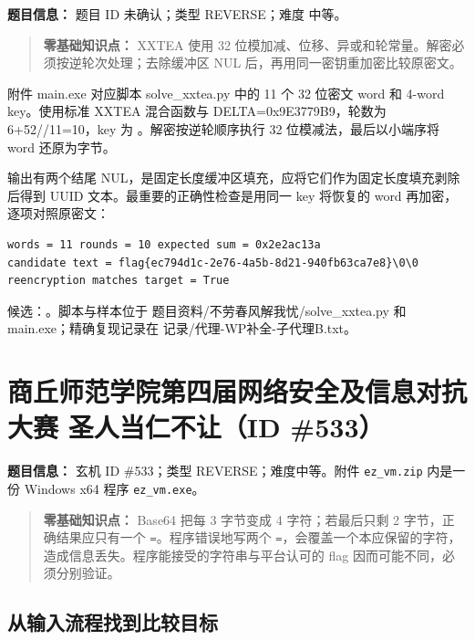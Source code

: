 \textbf{题目信息：} 题目 ID 未确认；类型 REVERSE；难度 中等。

\begin{quote}
\textbf{零基础知识点：} XXTEA 使用 32 位模加减、位移、异或和轮常量。解密必须按逆轮次处理；去除缓冲区 NUL 后，再用同一密钥重加密比较原密文。
\end{quote}

附件 main.exe 对应脚本 solve\_xxtea.py 中的 11 个 32 位密文 word 和 4-word key。使用标准 XXTEA 混合函数与 DELTA=0x9E3779B9，轮数为 6+52//11=10，key 为 \texttt{}。解密按逆轮顺序执行 32 位模减法，最后以小端序将 word 还原为字节。

输出有两个结尾 NUL，是固定长度缓冲区填充，应将它们作为固定长度填充剥除后得到 UUID 文本。最重要的正确性检查是用同一 key 将恢复的 word 再加密，逐项对照原密文：

\begin{verbatim}
words = 11 rounds = 10 expected sum = 0x2e2ac13a
candidate text = flag{ec794d1c-2e76-4a5b-8d21-940fb63ca7e8}\0\0
reencryption matches target = True
\end{verbatim}

候选：\texttt{}。脚本与样本位于 题目资料/不劳春风解我忧/solve\_xxtea.py 和 main.exe；精确复现记录在 记录/代理-WP补全-子代理B.txt。

\section{商丘师范学院第四届网络安全及信息对抗大赛 圣人当仁不让（ID \#533）}\label{ux5546ux4e18ux5e08ux8303ux5b66ux9662ux7b2cux56dbux5c4aux7f51ux7edcux5b89ux5168ux53caux4fe1ux606fux5bf9ux6297ux5927ux8d5b-ux5723ux4ebaux5f53ux4ec1ux4e0dux8ba9id-533}

\textbf{题目信息：} 玄机 ID \#533；类型 REVERSE；难度中等。附件 \texttt{ez\_vm.zip} 内是一份 Windows x64 程序 \texttt{ez\_vm.exe}。

\begin{quote}
\textbf{零基础知识点：} Base64 把每 3 字节变成 4 字符；若最后只剩 2 字节，正确结果应只有一个 \texttt{=}。程序错误地写两个 \texttt{=}，会覆盖一个本应保留的字符，造成信息丢失。程序能接受的字符串与平台认可的 flag 因而可能不同，必须分别验证。
\end{quote}

\subsection{从输入流程找到比较目标}\label{ux4eceux8f93ux5165ux6d41ux7a0bux627eux5230ux6bd4ux8f83ux76eeux6807}

